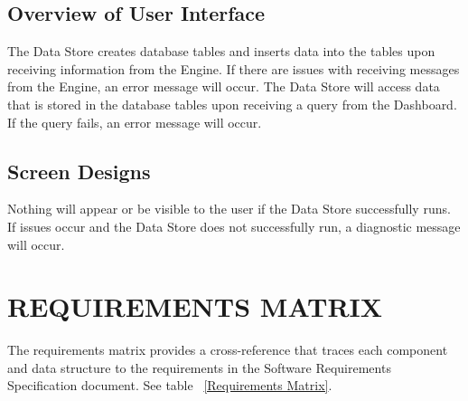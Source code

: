 \documentclass[letterpaper,12pt,oneside,listof=totoc]{scrreprt}
\begin{document}
\section{Overview of User Interface}


The Data Store creates database tables and inserts data into the tables upon receiving information from the Engine. If there are issues with receiving messages from the Engine, an error message will occur. The Data Store will access data that is stored in the database tables upon receiving a query from the Dashboard. If the query fails, an error message will occur. \\

\section{Screen Designs}


Nothing will appear or be visible to the user if the Data Store successfully runs. If issues occur and the Data Store does not successfully run, a diagnostic message will occur. 


\chapter{REQUIREMENTS MATRIX}

The requirements matrix provides a cross-reference that traces each component and data structure to the requirements in the Software Requirements Specification document. See table ~\ref{Requirements Matrix}.
\end{document}
